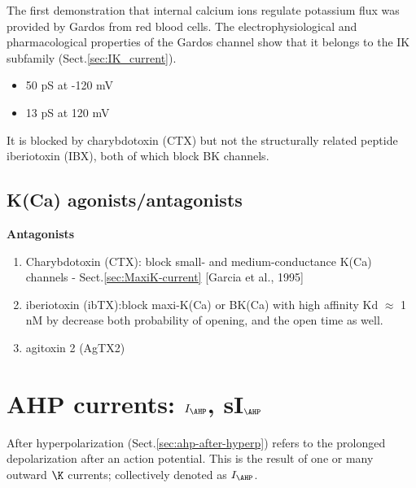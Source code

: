 The first demonstration that internal calcium ions regulate potassium flux was
provided by Gardos from red blood cells.
The electrophysiological and pharmacological properties of the Gardos channel
show that it belongs to the IK subfamily (Sect.\ref{sec:IK_current}). 
\begin{itemize}
  \item 50 pS at -120 mV
  \item 13 pS at 120 mV
\end{itemize}

It is blocked by charybdotoxin (CTX) but not the structurally related peptide
iberiotoxin (IBX), both of which block BK channels.

\subsection{K(Ca) agonists/antagonists}
\label{sec:K(Ca)_agonists}
\label{sec:K(Ca)_antagonists}

{\bf Antagonists}
\begin{enumerate}
  \item Charybdotoxin (CTX): block small- and medium-conductance K(Ca)
  channels - Sect.\ref{sec:MaxiK-current} [Garcia et al., 1995]


  \item iberiotoxin (ibTX):block maxi-K(Ca) or BK(Ca) with high affinity Kd
  $\approx$ 1 nM by decrease both probability of opening, and the open time as
  well.
  
  \item agitoxin 2 (AgTX2)
\end{enumerate}


\section{AHP currents: $I_\AHP$, sI$_\AHP$}
\label{sec:AHP-currents}


After hyperpolarization (Sect.\ref{sec:ahp-after-hyperp}) refers to the
prolonged depolarization after an action potential. This is the result of one or
many outward $\K$ currents; collectively denoted as $I_\AHP$.

